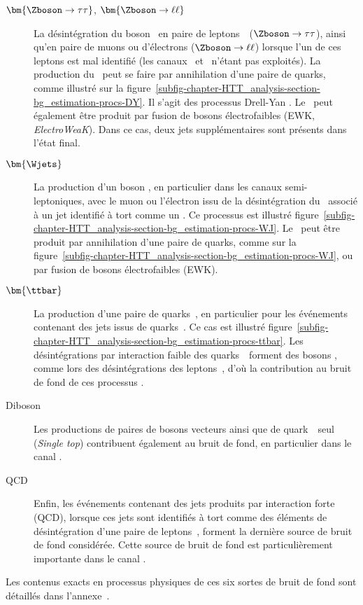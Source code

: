 \begin{description}
\item[$\bm{\Zboson\to\tau\tau}$, $\bm{\Zboson\to\ell\ell}$] La désintégration du boson \Zboson\ en paire de leptons~\tau\ ($\Zboson\to\tau\tau$),
ainsi qu'en paire de muons ou d'électrons ($\Zboson\to\ell\ell$) lorsque l'un de ces leptons est mal identifié (les canaux \mu\mu\ et \ele\ele\ n'étant pas exploités).
La production du \Zboson\ peut se faire par annihilation d'une paire de quarks, comme illustré sur la figure~\ref{subfig-chapter-HTT_analysis-section-bg_estimation-procs-DY}.
Il s'agit des processus \og Drell-Yan \fg.
Le \Zboson\ peut également être produit par fusion de bosons électrofaibles (EWK, \emph{ElectroWeaK}).
Dans ce cas, deux jets supplémentaires sont présents dans l'état final.
\item[$\bm{\Wjets}$] La production d'un boson \Wboson, en particulier dans les canaux semi-leptoniques, avec le muon ou l'électron issu de la désintégration du \Wboson\ associé à un jet identifié à tort comme un \tauh.
Ce processus est illustré figure~\ref{subfig-chapter-HTT_analysis-section-bg_estimation-procs-WJ}.
Le \Wboson\ peut être produit par annihilation d'une paire de quarks, comme sur la figure~\ref{subfig-chapter-HTT_analysis-section-bg_estimation-procs-WJ}, ou par fusion de bosons électrofaibles (EWK).
\item[$\bm{\ttbar}$] La production d'une paire de quarks~\quarkt, en particulier pour les événements contenant des jets issus de quarks~\quarkb.
Ce cas est illustré figure~\ref{subfig-chapter-HTT_analysis-section-bg_estimation-procs-ttbar}.
Les désintégrations par interaction faible des quarks~\quarkt\ forment des bosons \Wboson, comme lors des désintégrations des leptons~\tau, d'où la contribution au bruit de fond de ces processus \ttbar.
\item[Diboson] Les productions de paires de bosons vecteurs ainsi que de quark~\quarkt\ seul (\emph{Single top}) contribuent également au bruit de fond, en particulier dans le canal \ele\mu.
\item[QCD] Enfin, les événements contenant des jets produits par interaction forte (QCD), lorsque ces jets sont identifiés à tort comme des éléments de désintégration d'une paire de leptons~\tau, forment la dernière source de bruit de fond considérée.
Cette source de bruit de fond est particulièrement importante dans le canal \tauh\tauh.
\end{description}
Les contenus exacts en processus physiques de ces six sortes de bruit de fond sont détaillés dans l'annexe~.

